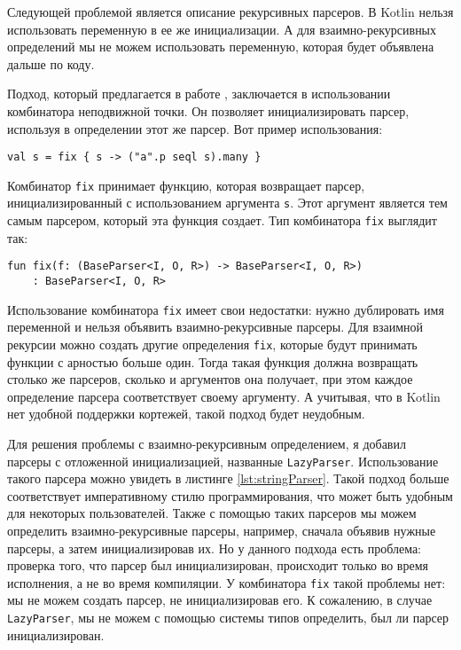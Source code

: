Следующей проблемой является описание рекурсивных парсеров. В Kotlin нельзя использовать переменную в ее же инициализации. А для взаимно-рекурсивных определений мы не можем использовать переменную, которая будет объявлена дальше по коду.

Подход, который предлагается в работе \cite{Meerkat}, заключается в использовании комбинатора неподвижной точки.
Он позволяет инициализировать парсер, используя в определении этот же парсер. Вот пример использования:
\begin{lstlisting}
val s = fix { s -> ("a".p seql s).many }
\end{lstlisting}
Комбинатор \texttt{fix} принимает функцию, которая возвращает парсер, инициализированный с использованием  аргумента \texttt{s}. Этот аргумент является тем самым парсером, который эта функция создает.
Тип комбинатора \texttt{fix} выглядит так:

\begin{nobreaks}
    \begin{lstlisting}
fun fix(f: (BaseParser<I, O, R>) -> BaseParser<I, O, R>)
    : BaseParser<I, O, R>
\end{lstlisting}
\end{nobreaks}

Использование комбинатора \texttt{fix} имеет свои недостатки: нужно дублировать имя переменной и нельзя объявить взаимно-рекурсивные парсеры. Для взаимной рекурсии можно создать другие определения \texttt{fix}, которые будут принимать функции с арностью больше один. Тогда такая функция должна возвращать столько же парсеров, сколько и аргументов она получает, при этом каждое определение парсера соответствует своему аргументу. А учитывая, что в Kotlin нет удобной поддержки кортежей, такой подход будет неудобным.

Для решения проблемы с взаимно-рекурсивным определением, я добавил парсеры с отложенной инициализацией, названные \texttt{LazyParser}. Использование такого парсера можно увидеть в листинге \ref{lst:stringParser}. Такой подход больше соответствует императивному стилю программирования, что может быть удобным для некоторых пользователей. Также с помощью таких парсеров мы можем определить взаимно-рекурсивные парсеры, например, сначала объявив нужные парсеры, а затем инициализировав их. Но у данного подхода есть проблема: проверка того, что парсер был инициализирован, происходит только во время исполнения, а не во время компиляции. У комбинатора \texttt{fix} такой проблемы нет: мы не можем создать парсер, не инициализировав его. К сожалению, в случае \texttt{LazyParser}, мы не можем с помощью системы типов определить, был ли парсер инициализирован.





